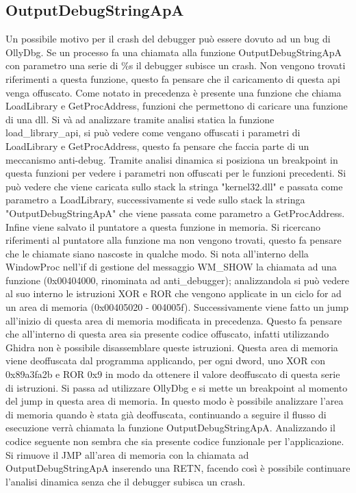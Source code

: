 \documentclass[a4paper,12pt]{article}
\begin{document}
\subsection{OutputDebugStringApA}
Un possibile motivo per il crash del debugger può essere dovuto ad un bug di OllyDbg. Se un processo fa una chiamata alla funzione OutputDebugStringApA con parametro una serie di \%s il debugger subisce un crash. Non vengono trovati riferimenti a questa funzione, questo fa pensare che il caricamento di questa api venga offuscato. Come notato in precedenza è presente una funzione che chiama LoadLibrary e GetProcAddress, funzioni che permettono di caricare una funzione di una dll. Si và ad analizzare tramite analisi statica la funzione load\_library\_api, si può vedere come vengano offuscati i parametri di LoadLibrary e GetProcAddress, questo fa pensare che faccia parte di un meccanismo anti-debug. Tramite analisi dinamica si posiziona un breakpoint in questa funzioni per vedere i parametri non offuscati per le funzioni precedenti. Si può vedere che viene caricata sullo stack la stringa "kernel32.dll" e passata come parametro a LoadLibrary, successivamente si vede sullo stack la stringa "OutputDebugStringApA" che viene passata come parametro a GetProcAddress. Infine viene salvato il puntatore a questa funzione in memoria. 
Si ricercano riferimenti al puntatore alla funzione ma non vengono trovati, questo fa pensare che le chiamate siano nascoste in qualche modo.  Si nota all'interno della WindowProc nell'if di gestione del messaggio WM\_SHOW la chiamata ad una funzione (0x00404000, rinominata ad anti\_debugger); analizzandola si può vedere al suo interno le istruzioni XOR e ROR che vengono applicate in un ciclo for ad un area di memoria (0x00405020 - 004005f).
 Successivamente viene fatto un jump all'inizio di questa area di memoria modificata in precedenza. Questo fa pensare che all'interno di questa area sia presente codice offuscato, infatti utilizzando Ghidra non è possibile disassemblare queste istruzioni.  Questa area di memoria viene deoffuscata dal programma applicando, per ogni dword, uno XOR con 0x89a3fa2b e ROR 0x9 in modo da ottenere il valore deoffuscato di questa serie di istruzioni.
 Si passa ad utilizzare OllyDbg e si mette un breakpoint al momento del jump in questa area di memoria. In questo modo è possibile analizzare l'area di memoria quando è stata già deoffuscata, continuando a seguire il flusso di esecuzione verrà chiamata la funzione OutputDebugStringApA. Analizzando il codice seguente non sembra che sia presente codice funzionale per l'applicazione. Si rimuove il JMP all'area di memoria con la chiamata ad OutputDebugStringApA inserendo una RETN, facendo così è possibile continuare l'analisi dinamica senza che il debugger subisca un crash.
\end{document}
